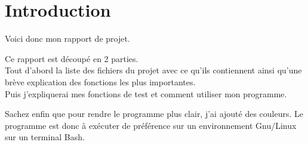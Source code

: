 \chapter{Introduction}

Voici donc mon rapport de projet.

Ce rapport est découpé en 2 parties.\\
Tout d'abord la liste des fichiers du projet avec ce qu'ils contiennent ainsi qu'une brève explication des fonctions les plus importantes.\\
Puis j'expliquerai mes fonctions de test et comment utiliser mon programme.

Sachez enfin que pour rendre le programme plus clair, j'ai ajouté des couleurs. 
Le programme est donc à exécuter de préférence sur un environnement Gnu/Linux sur un terminal Bash. 

\clearpage
